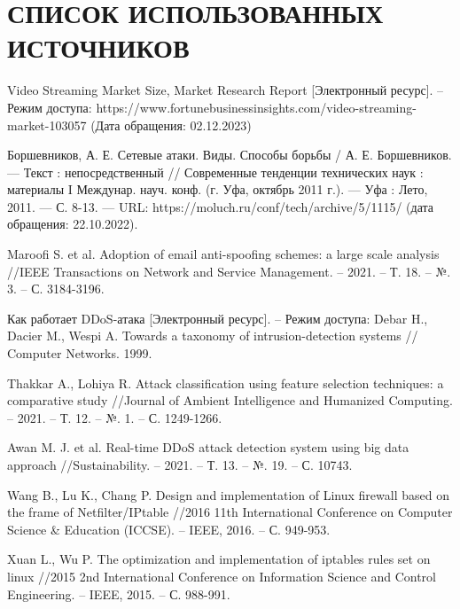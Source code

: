 \section*{СПИСОК ИСПОЛЬЗОВАННЫХ ИСТОЧНИКОВ}

\begingroup
\renewcommand{\section}[2]{}
\begin{thebibliography}{}
	 Video Streaming Market Size, Market Research Report [Электронный ресурс]. -- Режим доступа: https://www.fortunebusinessinsights.com/video-streaming-market-103057 (Дата обращения: 02.12.2023)
	
	 Боршевников, А. Е. Сетевые атаки. Виды. Способы борьбы / А. Е. Боршевников. — Текст : непосредственный // Современные тенденции технических наук : материалы I Междунар. науч. конф. (г. Уфа, октябрь 2011 г.). — Уфа : Лето, 2011. — С. 8-13. — URL: https://moluch.ru/conf/tech/archive/5/1115/ (дата обращения: 22.10.2022).
	
	 Maroofi S. et al. Adoption of email anti-spoofing schemes: a large scale analysis //IEEE Transactions on Network and Service Management. – 2021. – Т. 18. – №. 3. – С. 3184-3196.
	
	 Как работает DDoS-атака [Электронный ресурс]. -- Режим доступа: 
	 Debar H., Dacier M., Wespi A. Towards a taxonomy of intrusion-detection systems // Computer Networks. 1999.
	
	 Thakkar A., Lohiya R. Attack classification using feature selection techniques: a comparative study //Journal of Ambient Intelligence and Humanized Computing. – 2021. – Т. 12. – №. 1. – С. 1249-1266.
	
	 Awan M. J. et al. Real-time DDoS attack detection system using big data approach //Sustainability. – 2021. – Т. 13. – №. 19. – С. 10743.
	
	 Wang B., Lu K., Chang P. Design and implementation of Linux firewall based on the frame of Netfilter/IPtable //2016 11th International Conference on Computer Science \& Education (ICCSE). – IEEE, 2016. – С. 949-953.
	
	 Xuan L., Wu P. The optimization and implementation of iptables rules set on linux //2015 2nd International Conference on Information Science and Control Engineering. – IEEE, 2015. – С. 988-991.
	

\end{thebibliography}
